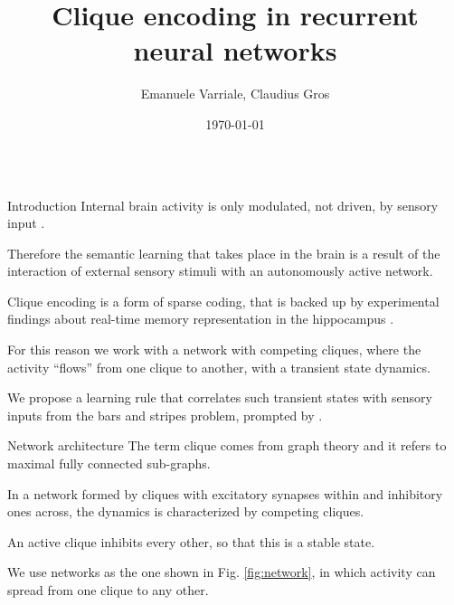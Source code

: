 \documentclass[final,hyperref={pdfpagelabels=false}]{beamer}
\title{Clique encoding in recurrent neural networks} %
\author[varriale@itp.uni-frankfurt.de]{Emanuele Varriale, Claudius Gros}
\institute{Institute for Theoretical Physics, Goethe University, Frankfurt am Main, Germany}
\date{\today}
\begin{document}
\begin{frame}

\begin{columns}
	
	\hfill
	\begin{column}{.30\textwidth}
		\begin{minipage}[T]{.95\textwidth}	%
		\parbox[t][\columnheight]{\textwidth}{

			\begin{block}{Introduction}
			Internal brain activity is only modulated, not driven, by sensory input \cite{fiser2004modulation}. 
				
			Therefore the semantic learning that takes place in the brain is a result of the interaction of external sensory stimuli with an autonomously active network.
				
			Clique encoding is a form of sparse coding, that is backed up by experimental findings about real-time memory representation in the hippocampus \cite{lin2006clique}.
				
			For this reason we work with a network with competing cliques, where the activity ``flows'' from one clique to another, with a transient state dynamics.
				
			We propose a learning rule that correlates such transient states with sensory inputs from the bars and stripes problem, prompted by \cite{gros2010semantic}.
			\end{block}
			
			\vfill
			\begin{block}{Network architecture}
			The term clique comes from graph theory and it refers to maximal fully connected sub-graphs. 
			
			In a network formed by cliques with excitatory synapses within and inhibitory ones across, the dynamics is characterized by competing cliques. 
			
			An active clique inhibits every other, so that this is a stable state.
			
			We use networks as the one shown in Fig. \ref{fig:network}, in which activity can spread from one clique to any other.
						

\end{block}}
\end{minipage}
\end{column}
\end{columns}
\end{frame}
\end{document}
